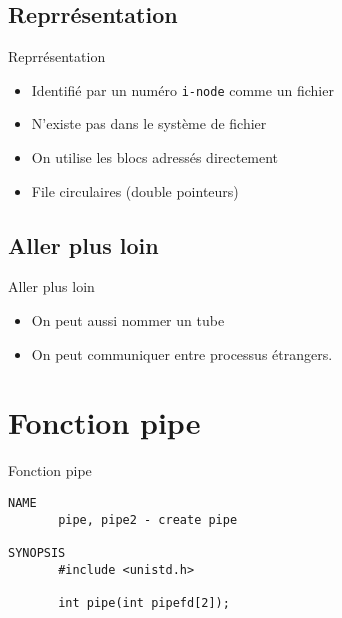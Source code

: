 \begin{frame}{\sectitle}
\def\subsectitle{Reprrésentation}
\subsection{\subsectitle}
\begin{block}{\subsectitle}
\begin{itemize}
    \item Identifié par un numéro \texttt{i-node} comme un fichier
    \item N'existe pas dans le système de fichier
    \item On utilise les blocs adressés directement
    \item File circulaires (double pointeurs)
\end{itemize}
\end{block}

\def\subsectitle{Aller plus loin}
\subsection{\subsectitle}
\begin{block}{\subsectitle}
\begin{itemize}
    \item On peut aussi nommer un tube
    \item On peut communiquer entre processus étrangers.
\end{itemize}
\end{block}

\end{frame}


\def\sectitle{Fonction pipe}
\section{\sectitle}
\begin{frame}[containsverbatim]{\sectitle}
\begin{block}{\subsectitle}
\begin{verbatim}
NAME
       pipe, pipe2 - create pipe

SYNOPSIS
       #include <unistd.h>

       int pipe(int pipefd[2]);
\end{verbatim}
\end{block}
\end{frame}


